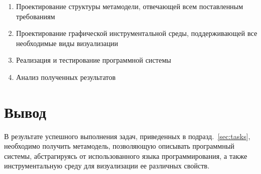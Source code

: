 \begin{enumerate}
    \item Проектирование структуры метамодели, отвечающей всем поставленным
    требованиям
    \item Проектирование графической инструментальной среды, поддерживающей все
    необходимые виды визуализации
    \item Реализация и тестирование программной системы
    \item Анализ полученных результатов
\end{enumerate}

\section{Вывод}
В результате успешного выполнения задач, приведенных в
подразд.~\ref{sec:tasks}, необходимо получить метамодель, позволяющую
описывать программный системы, абстрагируясь от использованного
языка программирования, а также инструментальную среду для визуализации ее
различных свойств.
